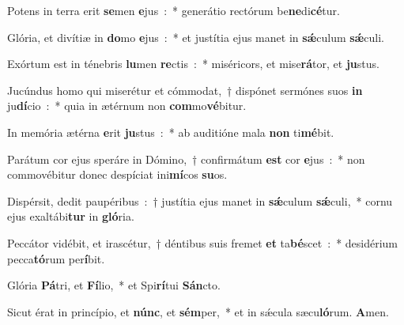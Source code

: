 ﻿\item Potens in terra erit \textbf{se}men \textbf{e}jus~:~* generátio rectórum be\textbf{ne}di\textbf{cé}tur.
\item Glória, et divítiæ in \textbf{do}mo \textbf{e}jus~:~* et justítia ejus manet in \textbf{sǽ}culum \textbf{sǽ}culi.
\item Exórtum est in ténebris \textbf{lu}men \textbf{re}ctis~:~* miséricors, et mise\textbf{rá}tor, et \textbf{ju}stus.
\item Jucúndus homo qui miserétur et cómmodat,~† dispónet sermónes suos \textbf{in} ju\textbf{dí}cio~:~* quia in ætérnum non \textbf{com}mo\textbf{vé}bitur.
\item In memória ætérna \textbf{e}rit \textbf{ju}stus~:~* ab auditióne mala \textbf{non} ti\textbf{mé}bit.
\item Parátum cor ejus speráre in Dómino,~† confirmátum \textbf{est} cor \textbf{e}jus~:~* non commovébitur donec despíciat ini\textbf{mí}cos \textbf{su}os.
\item Dispérsit, dedit paupéribus~:~† justítia ejus manet in \textbf{sǽ}culum \textbf{sǽ}culi,~* cornu ejus exaltábi\textbf{tur} in \textbf{gló}ria.
\item Peccátor vidébit, et irascétur,~† déntibus suis fremet \textbf{et} ta\textbf{bé}scet~:~* desidérium pecca\textbf{tó}rum per\textbf{í}bit.
\item Glória \textbf{Pá}tri, et \textbf{Fí}lio,~* et Spi\textbf{rí}tui \textbf{Sán}cto.
\item Sicut érat in princípio, et \textbf{núnc}, et \textbf{sém}per,~* et in sǽcula sæcu\textbf{ló}rum. \textbf{A}men.
